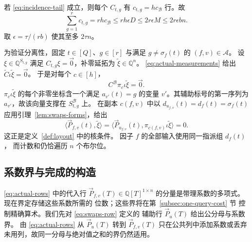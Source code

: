 \documentclass[11pt,reqno]{amsart}
\numberwithin{equation}{section}
\theoremstyle{definition}\newtheorem{definition}[theorem]{定义}
\theoremstyle{remark}\newtheorem{remark}[theorem]{注}
\renewcommand{\le}{\leqslant}
\begin{document}
若 \eqref{eq:incidence-tail} 成立，则每个 $C_{t,g}$
有 $c_{t,g}=hc_{\mathcal B}$ 行。故
\begin{equation}\label{eq:incidence-measurement-count}
 \sum_{g=1}^r c_{t,g}=rh c_{\mathcal B}
 \le rh\epsilon D\le2r\epsilon M\le2r\epsilon bn.
\end{equation}
取 $\epsilon=\tau/(rb)$ 使其至多 $2\tau n$。

为验证分离性，固定 $t\in[Q]$、$g\in[r]$ 与满足
$g\ne\sigma_f(t)$ 的 $(f,v)\in\mathcal A$。
设 $\xi\in\mathbb Q^{S_{t,g}}$ 满足
$C_{t,g}\xi=\vec{0}$，补零延拓为
$\widetilde\xi\in\mathbb Q^n$。
\eqref{eq:actual-measurements} 给出
$\widetilde C\iota\widetilde\xi=\vec{0}$。
于是对每个 $c\in[h]$，
\[
 C^{\mathcal B}\pi_c\iota\widetilde\xi=\vec{0}.
\]
$\pi_c\iota\widetilde\xi$ 的每个非零坐标含一个满足
$a_{v'}(t)=g$ 的变量 $v'$。其辅助标号的第一序列为
$a_{v'}$，故该向量支撑在 $S^{\mathcal B}_{t,g}$ 上。
在副本 $c(f,v)$ 中以 $d_{u_{f,v}}(t)=d_f(t)=\sigma_f(t)$
应用引理~\ref{lem:swaps-forms}，给出
\[
 \langle \vec{P}_{f,v}(t), \widetilde\xi\rangle
 =\langle \vec{P}_{u_{f,v}}(t), \pi_{c(f,v)}\iota\widetilde\xi\rangle=0.
\]
这正是定义~\ref{def:layout} 中的核条件。
因子 $f$ 的全部输入使用同一指派组 $d_f(t)$，
而计数和仍恰遍历 $n$ 个布尔位。

\subsection{系数界与完成的构造}
\eqref{eq:actual-rows} 中的代入行
$\vec{P}_{f,v}(T)\in\mathbb Q[T]^{1\times n}$
的分量是带理系数的多项式。现在界定存储这些系数所需的
位数；这些界将在第~\ref{subsec:one-query-cost} 节
控制精确算术。我们先对 \eqref{eq:swaps-row} 定义的
辅助行 $\vec{P}_u(T)$ 给出公分母与系数界。
由 \eqref{eq:actual-rows} 从 $\vec{P}_u(T)$
转到 $\vec{P}_{f,v}(T)$ 只在公共列中添加系数或丢弃
未用列，故同一分母与绝对值之和的界仍然适用。
\end{document}
